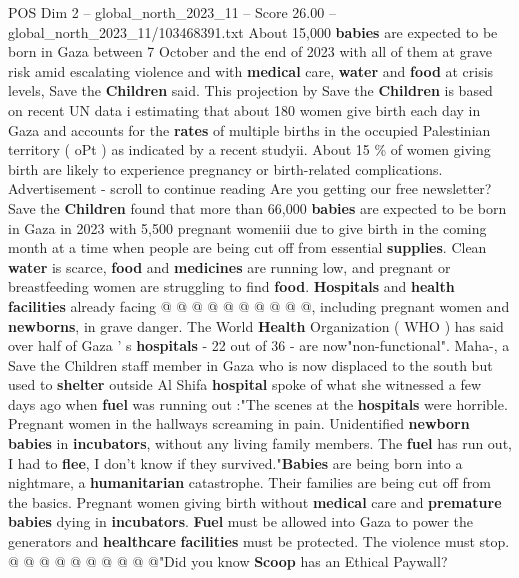 \begin{textsample}{POS Dim 2 – global\_north\_2023\_11 – Score 26.00 – global\_north\_2023\_11/103468391.txt}  \label{ex:f2_pos_240}
About 15,000 \textbf{babies} are expected to be born in Gaza between 7 October and the end of 2023 with all of them at grave risk amid escalating violence and with \textbf{medical} care, \textbf{water} and \textbf{food} at crisis levels, Save the \textbf{Children} said.
This projection by Save the \textbf{Children} is based on recent UN data i estimating that about 180 women give birth each day in Gaza and accounts for the \textbf{rates} of multiple births in the occupied Palestinian territory ( oPt ) as indicated by a recent studyii.
About 15 \% of women giving birth are likely to experience pregnancy or birth-related complications.
Advertisement - scroll to continue reading Are you getting our free newsletter?
Save the \textbf{Children} found that more than 66,000 \textbf{babies} are expected to be born in Gaza in 2023 with 5,500 pregnant womeniii due to give birth in the coming month at a time when people are being cut off from essential \textbf{supplies}.
Clean \textbf{water} is scarce, \textbf{food} and \textbf{medicines} are running low, and pregnant or breastfeeding women are struggling to find \textbf{food}. \textbf{Hospitals} and \textbf{health} \textbf{facilities} already facing @ @ @ @ @ @ @ @ @ @, including pregnant women and \textbf{newborns}, in grave danger.
The World \textbf{Health} Organization ( WHO ) has said over half of Gaza ' s \textbf{hospitals} - 22 out of 36 - are now"non-functional".
Maha-, a Save the Children staff member in Gaza who is now displaced to the south but used to \textbf{shelter} outside Al Shifa \textbf{hospital} spoke of what she witnessed a few days ago when \textbf{fuel} was running out :"The scenes at the \textbf{hospitals} were horrible.
Pregnant women in the hallways screaming in pain.
Unidentified \textbf{newborn} \textbf{babies} in \textbf{incubators}, without any living family members.
The \textbf{fuel} has run out, I had to \textbf{flee}, I don't know if they survived."\textbf{Babies} are being born into a nightmare, a \textbf{humanitarian} catastrophe.
Their families are being cut off from the basics.
Pregnant women giving birth without \textbf{medical} care and \textbf{premature} \textbf{babies} dying in \textbf{incubators}. \textbf{Fuel} must be allowed into Gaza to power the generators and \textbf{healthcare} \textbf{facilities} must be protected.
The violence must stop. @ @ @ @ @ @ @ @ @ @"Did you know \textbf{Scoop} has an Ethical Paywall?

\end{textsample}
